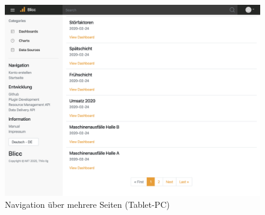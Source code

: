 \begin{figure}[h]
    \centering
    \includegraphics[scale=0.35]{img/desktop/Pagination}
    \caption{Navigation über mehrere Seiten (Tablet-PC)}
    \label{figure:navigationuebermehrereseiten}
\end{figure}
